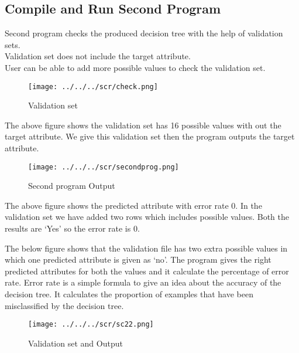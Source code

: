\documentclass{article}
\begin{document}
\pagebreak


\subsection{Compile and Run Second Program}
\label{sec:crprog}

Second program checks the produced decision tree with the help of validation sets.\\
Validation set does not include the target attribute.\\
User can be able to add more possible values to check the validation set.\\

\begin{figure}[hbtp]
\centering
\texttt{[image: ../../../scr/check.png]}
\caption{Validation set}
\end{figure}

The above figure shows the validation set has 16 possible values with out the target attribute. We give this validation set then the program outputs the target attribute.

\pagebreak

\begin{figure}[hbtp]
\centering
\texttt{[image: ../../../scr/secondprog.png]}
\caption{Second program Output }
\end{figure}

The above figure shows the predicted attribute with error rate 0. In the validation set we have added two rows which includes possible values. Both the results are `Yes' so the error rate is 0. 
\pagebreak

The below figure shows that the validation file has two extra possible values in which one predicted attribute is given as `no'. 
The program gives the right predicted attributes for both the values and it calculate the percentage of error rate. Error rate is a simple formula to give an idea about the accuracy of the decision tree. It calculates the proportion of examples that have been misclassified by the decision tree.

\begin{figure}[hbtp]
\centering
\texttt{[image: ../../../scr/sc22.png]}
\caption{Validation set and Output}
\end{figure}

\pagebreak
\end{document}
